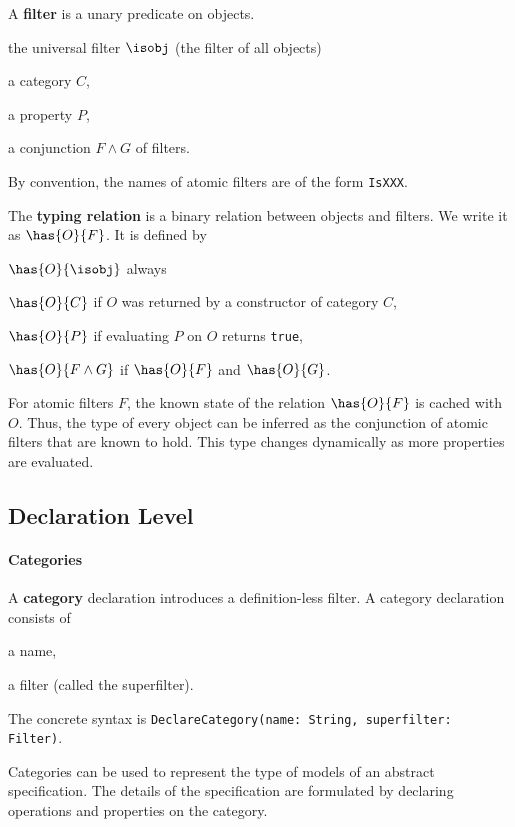 A \textbf{filter} is a unary predicate on objects.
\begin{compactitem}
  \item the universal filter $\isobj$ (the filter of all objects)
  \item a category $C$,
  \item a property $P$,
  \item a conjunction $F\wedge G$ of filters.
\end{compactitem}
By convention, the names of atomic filters are of the form \lstinline|IsXXX|.

The \textbf{typing relation} is a binary relation between objects and filters.
We write it as $\has{O}{F}$.
It is defined by
\begin{compactitem}
  \item $\has{O}{\isobj}$ always
  \item $\has{O}{C}$ if $O$ was returned by a constructor of category $C$,
  \item $\has{O}{P}$ if evaluating $P$ on $O$ returns \lstinline|true|,
  \item $\has{O}{F\wedge G}$ if $\has{O}{F}$ and $\has{O}{G}$.
\end{compactitem}

For atomic filters $F$, the known state of the relation $\has{O}{F}$ is cached with $O$.
Thus, the type of every object can be inferred as the conjunction of atomic filters that are known to hold.
This type changes dynamically as more properties are evaluated.

\subsection{Declaration Level}

\paragraph{Categories}
A \textbf{category} declaration introduces a definition-less filter.
A category declaration consists of
\begin{compactitem}
  \item a name,
  \item a filter (called the superfilter).
\end{compactitem}
The concrete syntax is \lstinline|DeclareCategory(name: String, superfilter: Filter)|.

Categories can be used to represent the type of models of an abstract specification.
The details of the specification are formulated by declaring operations and properties on the category.

